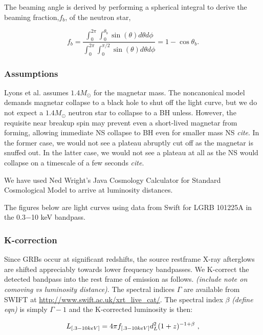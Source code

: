 \documentclass{article}
\begin{document}
The beaming angle is derived by performing a spherical integral to derive the beaming fraction,$f_b$, of the neutron star,

\begin{equation}
f_b=\frac{\int_0^{2\pi} \int_0^{\theta_b} \sin(\theta) d\theta d\phi}{\int_0^{2\pi} \int_0^{\pi/2} \sin(\theta) d\theta d\phi} = 1-\cos{\theta_b}.
\end{equation}

\subsubsection{Assumptions}

Lyons et al. assumes $1.4 M_{\odot}$ for the magnetar mass. The noncanonical model demands magnetar collapse to a black hole to shut off the light curve, but we do not expect a $1.4 M_{\odot}$  neutron star to collapse to a BH unless. However, the requisite near breakup spin may prevent even a short-lived magnetar from forming, allowing immediate NS collapse to BH even for smaller mass NS \textit{cite}. In the former case, we would not see a plateau abruptly cut off as the magnetar is snuffed out. In the latter case, we would not see a plateau at all as the NS would collapse on a timescale of a few seconds \textit{cite}.
\hspace{2cm}

We have used Ned Wright's Java Cosmology Calculator for Standard Cosmological Model to arrive at luminosity distances.

The figures below are light curves using data from Swift for LGRB 101225A in the 0.3$-$10 keV bandpass.


\subsubsection{K-correction}
Since GRBs occur at significant redshifts, the source restframe X-ray afterglows are shifted appreciably towards lower frequency bandpasses.  We K-correct the detected bandpass into the rest frame of emission  as follows. \textit{(include note on comoving vs luminosity distance)}. The spectral indices $\Gamma$ are available from SWIFT at \url{http://www.swift.ac.uk/xrt_live_cat/}. The spectral index $\beta$ \textit{(define eqn)} is simply $\Gamma -1$ and the K-corrected luminosity is then:

\begin{equation} L_{[.3-10 keV]} = 4\pi\* f_{[.3-10 keV]}d_{L}^2  (1+z)^{-1+\beta}\,\,,
\end{equation}
\end{document}
